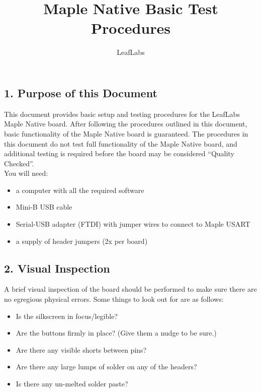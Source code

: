 \documentclass[a4paper,12pt]{report}
\begin{document}
\title{Maple Native Basic Test Procedures}
\author{LeafLabs}
\maketitle

\section*{}
\subsection*{1. Purpose of this Document}
This document provides basic setup and testing procedures for the LeafLabs Maple Native board. After following the procedures outlined in this document, basic functionality of the Maple Native board is guaranteed. The procedures in this document do not test full functionality of the Maple Native board, and additional testing is required before the board may be considered ``Quality Checked''.\\

You will need:

\begin{itemize}
\item a computer with all the required software
\item Mini-B USB cable
\item Serial-USB adapter (FTDI) with jumper wires to connect to Maple USART
\item a supply of header jumpers (2x per board)
\end{itemize}

\clearpage
\subsection*{2. Visual Inspection}

A brief visual inspection of the board should be performed to make sure there are no egregious physical errors. Some things to look out for are as follows:
\begin{itemize}
\item Is the silkscreen in focus/legible?
\item Are the buttons firmly in place? (Give them a nudge to be sure.)
\item Are there any visible shorts between pins?
\item Are there any large lumps of solder on any of the headers?
\item Is there any un-melted solder paste?
\end{itemize}
\end{document}
